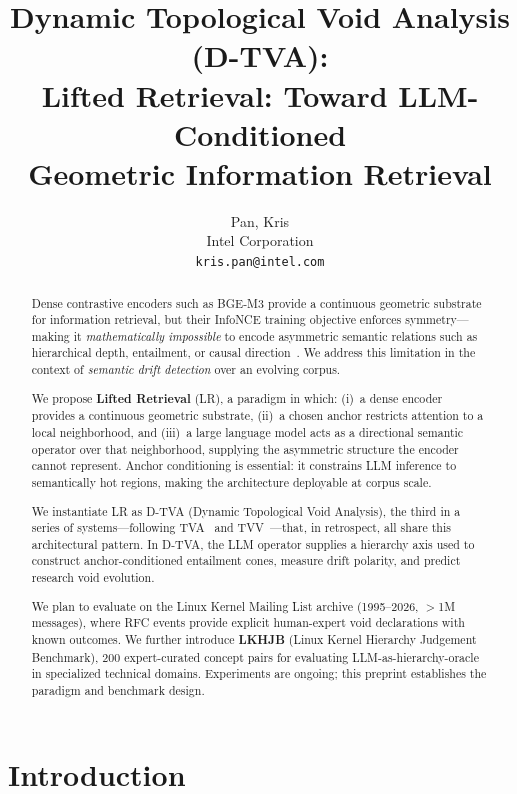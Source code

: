 \documentclass[twocolumn]{article}
\title{%
  Dynamic Topological Void Analysis (D-TVA):\\
  Lifted Retrieval: Toward LLM-Conditioned\\
  Geometric Information Retrieval
}
\author{
  Pan, Kris \\
  Intel Corporation \\
  \texttt{kris.pan@intel.com}
}
\date{}
\newcommand{\dtva}{\textsc{D-TVA}}
\newcommand{\tva}{\textsc{TVA}}
\newcommand{\tvv}{\textsc{TVV}}
\newcommand{\lr}{\textsc{LR}}
\begin{document}
\maketitle

\begin{abstract}
Dense contrastive encoders such as BGE-M3 provide a continuous geometric
substrate for information retrieval, but their InfoNCE training objective
enforces symmetry---making it \emph{mathematically impossible} to encode
asymmetric semantic relations such as hierarchical depth, entailment, or
causal direction~\cite{wang2020understanding}.
We address this limitation in the context of \emph{semantic drift detection}
over an evolving corpus.

We propose \textbf{Lifted Retrieval} (\lr{}), a paradigm in which:
(i)~a dense encoder provides a continuous geometric substrate,
(ii)~a chosen anchor restricts attention to a local neighborhood, and
(iii)~a large language model acts as a directional semantic operator
over that neighborhood, supplying the asymmetric structure the encoder
cannot represent.
Anchor conditioning is essential: it constrains LLM inference to
semantically hot regions, making the architecture deployable at corpus scale.

We instantiate \lr{} as \dtva{} (Dynamic Topological Void Analysis),
the third in a series of systems---following \tva{}~\cite{pan2026tva}
and \tvv{}~\cite{pan2026tvv}---that, in retrospect, all share this
architectural pattern.
In \dtva{}, the LLM operator supplies a hierarchy axis used to construct
anchor-conditioned entailment cones, measure drift polarity, and predict
research void evolution.

We plan to evaluate on the Linux Kernel Mailing List archive (1995--2026,
$>$1M messages), where RFC events provide explicit human-expert void
declarations with known outcomes.
We further introduce \textbf{LKHJB} (Linux Kernel Hierarchy Judgement
Benchmark), 200 expert-curated concept pairs for evaluating
LLM-as-hierarchy-oracle in specialized technical domains.
Experiments are ongoing; this preprint establishes the paradigm
and benchmark design.
\end{abstract}

\section{Introduction}
\label{sec:intro}
\end{document}
